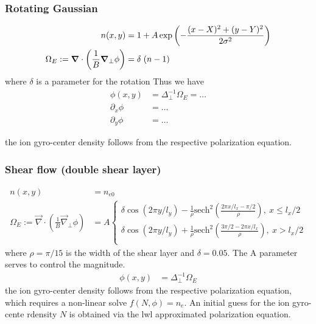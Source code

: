 \subsubsection{Rotating Gaussian}
\begin{align}
    n(x,y) &= 1 + A\exp\left( -\frac{(x-X)^2 + (y-Y)^2}{2\sigma^2}\right) \\
    \Omega_E:= \vec{\nabla} \cdot \left(\frac{1}{B} \vec{\nabla}_\perp \phi\right) &= \delta \hspace{1mm} (n-1)
\end{align}
where \(\delta\) is a parameter for the rotation
Thus we have
\begin{align}
  \phi(x,y) &= \Delta_\perp^{-1} \Omega_E = \dots \\
  \partial_x \phi &= \dots \\
   \partial_y \phi &= \dots
\end{align}

the ion gyro-center density follows from the respective polarization equation.

\subsubsection{Shear flow (double shear layer)}
\begin{align}
 n(x,y) &= n_{e0}\\
    \Omega_E:= \vec{\nabla} \cdot \left(\frac{1}{B} \vec{\nabla}_\perp \phi\right) &= A
    \begin{cases}
        \delta \cos(2 \pi y/l_y) - \frac{1}{\rho} \text{sech}^2 \left(\frac{2 \pi x/l_x-\pi/2}{\rho}\right),\ x \leq l_x/2 \\
        \delta \cos(2 \pi y/l_y) + \frac{1}{\rho} \text{sech}^2 \left(\frac{3 \pi /2-2 \pi x/l_x}{\rho}\right),\ x > l_x/2 \\
    \end{cases}
\end{align}
where \(\rho=\pi/15\) is the width of the shear layer and \(\delta=0.05\). The A parameter serves to control the magnitude.
\begin{align}
  \phi(x,y) &= \Delta_\perp^{-1} \Omega_E
\end{align}
the ion gyro-center density follows from the respective polarization equation, which requires a non-linear solve \(f(N,\phi) = n_e\). An initial guess for the ion gyro-cente rdensity \(N\) is obtained via the lwl approximated polarization equation.

